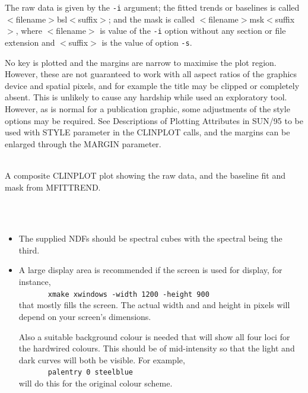 \documentclass[twoside,11pt]{article}
\newcommand{\latex}[1]{#1}
\newcommand{\xref}[3]{#1}
\renewcommand{\_}{\texttt{\symbol{95}}}
\newcommand{\sstdiytopic}[2]{\item[{\hspace{-0.35em}#1\hspace{-0.35em}:}] \mbox{} \\[1.3ex] #2}
\newcommand{\ssthitemlist}[1]{
  \mbox{} \\
  \vspace{-8.0ex}
  \begin{itemize}
     #1
  \end{itemize}
}
\newcommand{\sstitem}{\item}
\newcommand{\sstdiytopic}[2]{\item[{#1}]
      \begin{description}
         #2
      \end{description}
   }
\newcommand{\ssthitemlist}[1]{
      \begin{itemize}
         #1
      \end{itemize}
      \\
   }
\begin{document}
{{{         \sstitem

         The raw data is given by the {\tt -i} argument; the fitted
	 trends or baselines is called $<$filename$>$\_bsl$<$suffix$>$;
         and the mask is called $<$filename$>$\_msk$<$suffix$>$, where
         $<$filename$>$ is value of the {\tt -i} option without any section
         or file extension and $<$suffix$>$ is the value of option {\tt -s}.

         \sstitem
         No key is plotted and the margins are narrow to maximise the
         plot region.  However, these are not guaranteed to work with
         all aspect ratios of the graphics device and spatial pixels, and
         for example the title may be clipped or completely absent.  This
         is unlikely to cause any hardship while used an exploratory tool.
         However, as is normal for a publication graphic, some adjustments
         of the style options may be required.  See \xref{Descriptions of
         Plotting Attributes}{sun95}{se_plotting_attr} \latex{in SUN/95}
         to be used with STYLE parameter in the CLINPLOT calls, and the
         margins can be enlarged through the MARGIN parameter.
      }
   }
   \sstdiytopic{
      Output
   }{
      A composite CLINPLOT plot showing the raw data, and the baseline
      fit and mask from MFITTREND.
   }
   \sstdiytopic{
      Prior Requirements
   }{
      \ssthitemlist{

         \sstitem
         The supplied NDFs should be spectral cubes with the spectral
         being the third.

         \sstitem
         A large display area is recommended if the screen is used
         for display, for instance, \\
         \mbox{~~~~~~~}{\tt xmake xwindows -width 1200 -height 900} \\
         that mostly fills the screen.  The actual width and and height
         in pixels will depend on your screen's dimensions.

         Also a suitable background colour is needed that will show all
         four loci for the hardwired colours.  This should be of
         mid-intensity so that the light and dark curves will both be
         visible.  For example,\\
         \mbox{~~~~~~~}{\tt palentry 0 steelblue}\\
         will do this for the original colour scheme.
      }
   }
}
\newpage
\end{document}
